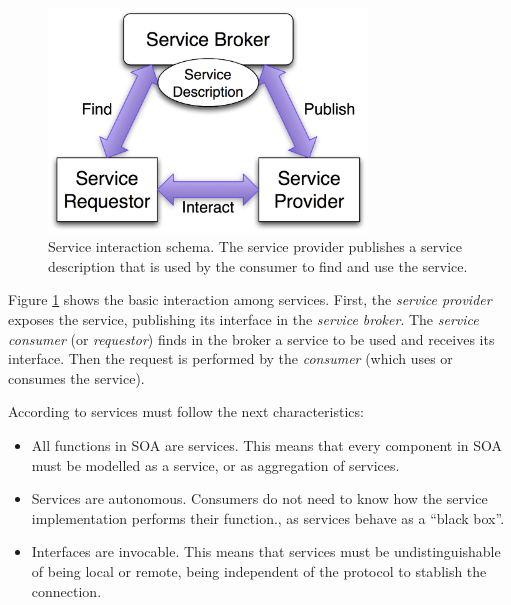 \begin{figure}
\centering
\includegraphics[width=20pc]{gfx/soa/soaDiagram.jpg}
\caption{Service interaction schema. The service provider publishes a service description that is used by the consumer to find and use the service.}
\label{fig:soadiagram}
\end{figure}




Figure \ref{fig:soadiagram} shows the basic interaction among
services. First, the {\em service provider} exposes the service, publishing
its interface in the {\em service broker}. The {\em service consumer} (or
{\em requestor}) finds in the broker a service to be used and receives its
interface. Then the request is performed by the {\em consumer} (which uses or
consumes the service).  

According to  \cite{Channabasavaiah2003migrating} services must follow the next characteristics:

\begin{itemize}
\item All functions in SOA are services. This means that every component in SOA must be modelled as a service, or as aggregation of services. 
\item Services are autonomous. Consumers do not need to know how the service implementation performs their function., as services behave as a ``black box''.
\item Interfaces are invocable. This means that services must be undistinguishable of being local or remote, being independent of the protocol to stablish the connection.
\end{itemize}

